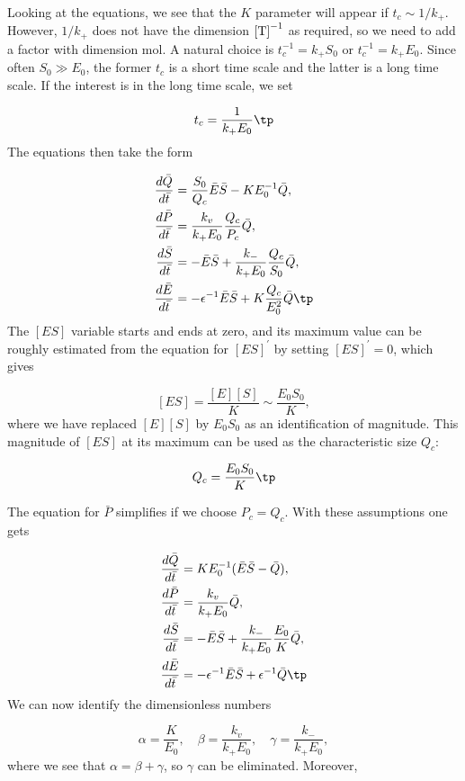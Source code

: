 \documentclass[graybox,envcountchap,sectrefs,final]{svmonodo}
\begin{document}
Looking at the equations, we see that the $K$ parameter will appear
if $t_c\sim 1/k_+$. However, $1/k_+$ does not have the dimension
$\hbox{[T]}^{-1}$ as required, so we need to add a factor with dimension
mol. A natural choice is
$t_c^{-1}=k_+S_0$ or $t_c^{-1}=k_+E_0$. Since often $S_0\gg E_0$,
the former $t_c$ is a short time scale and the latter is a long
time scale. If the interest is in the long time scale, we set

\[ t_c = \frac{1}{k_+E_0}\tp\]
The equations then take the form

\begin{align*}
\frac{d\bar Q}{d\bar t} &= \frac{S_0}{Q_c}\bar E\bar S
- KE_0^{-1}\bar Q,\\ 
\frac{d\bar P}{d\bar t} &= \frac{k_v}{k_+ E_0}\frac{Q_c}{P_c}\bar Q,\\ 
\frac{d\bar S}{d\bar t} &= -\bar E\bar S
+ \frac{k_-}{k_+E_0}\frac{Q_c}{S_0}\bar Q,\\ 
\frac{d\bar E}{d\bar t} &= -\epsilon^{-1}\bar E\bar S
+ K\frac{Q_c}{E_0^2}\bar Q\tp
\end{align*}
The $[ES]$ variable starts and ends at zero, and its maximum value
can be roughly estimated from the equation for $[ES]^\prime$
by setting $[ES]^\prime = 0$, which gives

\[ [ES] = \frac{[E][S]}{K}\sim \frac{E_0S_0}{K},\]
where we have replaced $[E][S]$ by $E_0S_0$ as an identification
of magnitude. This magnitude of $[ES]$
at its maximum can be used as the characteristic size $Q_c$:

\[ Q_c = \frac{E_0S_0}{K}\tp\]

The equation for $\bar P$ simplifies if we choose $P_c=Q_c$.
With these assumptions one gets

\begin{align*}
\frac{d\bar Q}{d\bar t} &= KE_0^{-1} (\bar E\bar S
- \bar Q),\\ 
\frac{d\bar P}{d\bar t} &= \frac{k_v}{k_+ E_0}\bar Q,\\ 
\frac{d\bar S}{d\bar t} &= -\bar E\bar S
+ \frac{k_-}{k_+E_0}\frac{E_0}{K}\bar Q,\\ 
\frac{d\bar E}{d\bar t} &= -\epsilon^{-1}\bar E\bar S
+ \epsilon^{-1}\bar Q\tp
\end{align*}
We can now identify the dimensionless numbers

\[ \alpha = \frac{K}{E_0},\quad \beta = \frac{k_v}{k_+ E_0},
\quad \gamma = \frac{k_-}{k_+E_0},
\]
where we see that $\alpha = \beta + \gamma$, so $\gamma$ can be eliminated.
Moreover,
\end{document}
